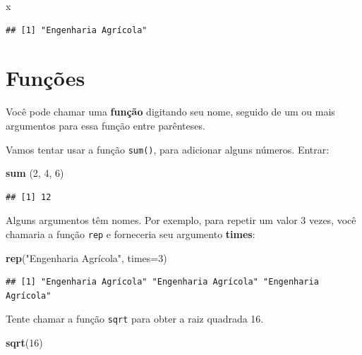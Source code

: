 \documentclass[]{book}
\newenvironment{Shaded}{\begin{snugshade}}{\end{snugshade}}
\newcommand{\DataTypeTok}[1]{\textcolor[rgb]{0.13,0.29,0.53}{#1}}
\newcommand{\DecValTok}[1]{\textcolor[rgb]{0.00,0.00,0.81}{#1}}
\newcommand{\KeywordTok}[1]{\textcolor[rgb]{0.13,0.29,0.53}{\textbf{#1}}}
\newcommand{\NormalTok}[1]{#1}
\newcommand{\StringTok}[1]{\textcolor[rgb]{0.31,0.60,0.02}{#1}}
\begin{document}
\begin{Shaded}
\begin{Highlighting}[]
\NormalTok{x}
\end{Highlighting}
\end{Shaded}

\begin{verbatim}
## [1] "Engenharia Agrícola"
\end{verbatim}

\hypertarget{funcoes}{%
\section{Funções}\label{funcoes}}

Você pode chamar uma \textbf{função} digitando seu nome, seguido de um ou mais argumentos para essa função entre parênteses.

Vamos tentar usar a função \texttt{sum()}, para adicionar alguns números. Entrar:

\begin{Shaded}
\begin{Highlighting}[]
\KeywordTok{sum}\NormalTok{ (}\DecValTok{2}\NormalTok{, }\DecValTok{4}\NormalTok{, }\DecValTok{6}\NormalTok{)}
\end{Highlighting}
\end{Shaded}

\begin{verbatim}
## [1] 12
\end{verbatim}

Alguns argumentos têm nomes. Por exemplo, para repetir um valor 3 vezes, você chamaria a função \texttt{rep} e forneceria seu argumento \textbf{times}:

\begin{Shaded}
\begin{Highlighting}[]
\KeywordTok{rep}\NormalTok{(}\StringTok{"Engenharia Agrícola"}\NormalTok{, }\DataTypeTok{times=}\DecValTok{3}\NormalTok{)}
\end{Highlighting}
\end{Shaded}

\begin{verbatim}
## [1] "Engenharia Agrícola" "Engenharia Agrícola" "Engenharia Agrícola"
\end{verbatim}

Tente chamar a função \texttt{sqrt} para obter a raiz quadrada 16.

\begin{Shaded}
\begin{Highlighting}[]
\KeywordTok{sqrt}\NormalTok{(}\DecValTok{16}\NormalTok{)}
\end{Highlighting}
\end{Shaded}
\end{document}
